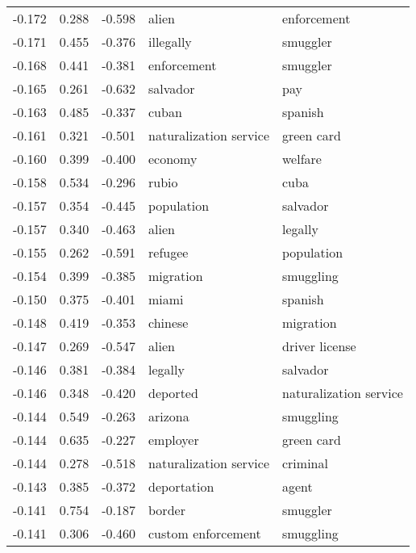 \begin{tabular}{cccp{5cm}p{5cm}}
-0.172 & 0.288 & -0.598 & alien & enforcement \\
-0.171 & 0.455 & -0.376 & illegally & smuggler \\
-0.168 & 0.441 & -0.381 & enforcement & smuggler \\
-0.165 & 0.261 & -0.632 & salvador & pay \\
-0.163 & 0.485 & -0.337 & cuban & spanish \\
-0.161 & 0.321 & -0.501 & naturalization service & green card \\
-0.160 & 0.399 & -0.400 & economy & welfare \\
-0.158 & 0.534 & -0.296 & rubio & cuba \\
-0.157 & 0.354 & -0.445 & population & salvador \\
-0.157 & 0.340 & -0.463 & alien & legally \\
-0.155 & 0.262 & -0.591 & refugee & population \\
-0.154 & 0.399 & -0.385 & migration & smuggling \\
-0.150 & 0.375 & -0.401 & miami & spanish \\
-0.148 & 0.419 & -0.353 & chinese & migration \\
-0.147 & 0.269 & -0.547 & alien & driver license \\
-0.146 & 0.381 & -0.384 & legally & salvador \\
-0.146 & 0.348 & -0.420 & deported & naturalization service \\
-0.144 & 0.549 & -0.263 & arizona & smuggling \\
-0.144 & 0.635 & -0.227 & employer & green card \\
-0.144 & 0.278 & -0.518 & naturalization service & criminal \\
-0.143 & 0.385 & -0.372 & deportation & agent \\
-0.141 & 0.754 & -0.187 & border & smuggler \\
-0.141 & 0.306 & -0.460 & custom enforcement & smuggling \\
\bottomrule
\end{tabular}
